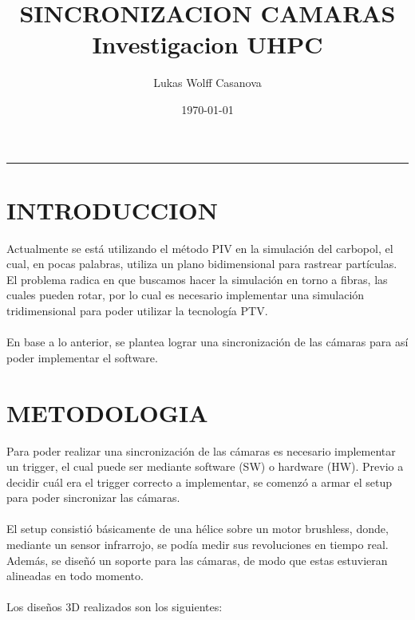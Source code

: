\documentclass{article}
\title{\textbf{SINCRONIZACION CAMARAS}\\[0.5em] \large Investigacion UHPC}
\author{Lukas Wolff Casanova}
\date{\today}
\begin{document}
\maketitle
\hrule

\section{INTRODUCCION}

\noindent Actualmente se está utilizando el método PIV en la simulación del carbopol, el cual, en pocas palabras, utiliza un plano bidimensional para rastrear partículas. El problema radica en que buscamos hacer la simulación en torno a fibras, las cuales pueden rotar, por lo cual es necesario implementar una simulación tridimensional para poder utilizar la tecnología PTV.
\\ \\
En base a lo anterior, se plantea lograr una sincronización de las cámaras para así poder implementar el software.

\section{METODOLOGIA}

\noindent Para poder realizar una sincronización de las cámaras es necesario implementar un trigger, el cual puede ser mediante software (SW) o hardware (HW). Previo a decidir cuál era el trigger correcto a implementar, se comenzó a armar el setup para poder sincronizar las cámaras.
\\ \\
El setup consistió básicamente de una hélice sobre un motor brushless, donde, mediante un sensor infrarrojo, se podía medir sus revoluciones en tiempo real. Además, se diseñó un soporte para las cámaras, de modo que estas estuvieran alineadas en todo momento.
\\ \\
Los diseños 3D realizados son los siguientes:
\end{document}
